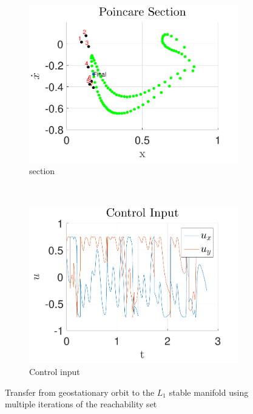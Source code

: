 \documentclass[smallcondensed]{svjour3}
\begin{document}
\begin{figure}
        \begin{subfigure}[htbp]{0.5\textwidth} 
                \includegraphics[width=\textwidth]{poincare} 
                \caption{\Poincare section} \label{fig:geo_transfer_poincare} 
        \end{subfigure}~%
        \begin{subfigure}[htbp]{0.5\textwidth} 
                \includegraphics[width=\textwidth]{control_input_geo} 
                \caption{Control input} \label{fig:control_input_geo} 
        \end{subfigure} 
        \caption{Transfer from geostationary orbit to the \( L_1 \) stable manifold using multiple iterations of the reachability set}
        \label{fig:geo_transfer} 
\end{figure}
\end{document}
